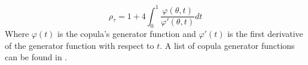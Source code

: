 \begin{equation}
\rho_\tau = 1 + 4 \int_0^1 \frac{\varphi(\theta,t)}{\varphi'(\theta, t)}dt
\label{eq:tauar}
\end{equation}
Where $\varphi(t)$ is the copula's generator function and $\varphi'(t)$ is the first derivative of the generator function with respect to $t$. A list of copula generator functions can be found in \cite{Nelsen2006}. 




